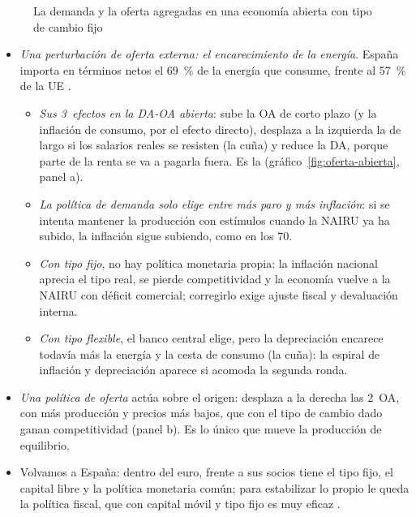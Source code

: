\documentclass[11pt]{article}
\begin{document}
\begin{figure}[H]
\centering
\caption{La demanda y la oferta agregadas en una economía abierta con tipo de cambio fijo}\label{fig:da-oa-abierta}
\end{figure}

\begin{itemize}
\item \emph{Una perturbación de oferta externa: el encarecimiento de la energía}. España importa en términos netos el 69~\% de la energía que consume, frente al 57~\% de la UE\nocite{Eurostat2026nrgindid} .
  \begin{itemize}
  \item \emph{Sus 3~efectos en la DA-OA abierta}: sube la OA de corto plazo (y la inflación de consumo, por el efecto directo), desplaza a la izquierda la de largo si los salarios reales se resisten (la cuña) y reduce la DA, porque parte de la renta se va a pagarla fuera. Es la  (gráfico~\ref{fig:oferta-abierta}, panel a).
  \item \emph{La política de demanda solo elige entre más paro y más inflación}: si se intenta mantener la producción con estímulos cuando la NAIRU ya ha subido, la inflación sigue subiendo, como en los 70\nocite{CarlinSoskice2015Macroeconomics}.
  \item \emph{Con tipo fijo}, no hay política monetaria propia: la inflación nacional aprecia el tipo real, se pierde competitividad y la economía vuelve a la NAIRU con déficit comercial; corregirlo exige ajuste fiscal y devaluación interna.
  \item \emph{Con tipo flexible}, el banco central elige, pero la depreciación encarece todavía más la energía y la cesta de consumo (la cuña): la espiral de inflación y depreciación aparece si acomoda la segunda ronda.
  \end{itemize}
\item \emph{Una política de oferta} actúa sobre el origen: desplaza a la derecha las 2~OA, con más producción y precios más bajos, que con el tipo de cambio dado ganan competitividad (panel b). Es lo único que mueve la producción de equilibrio.
\item Volvamos a España: dentro del euro, frente a sus socios tiene el tipo fijo, el capital libre y la política monetaria común; para estabilizar lo propio le queda la política fiscal, que con capital móvil y tipo fijo es muy eficaz .
\end{itemize}
\end{document}
